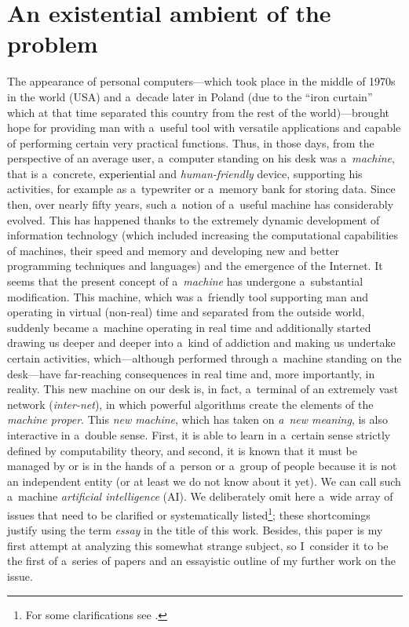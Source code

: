 \section{An existential ambient of the problem}
The appearance of personal computers—which took place in the middle of 1970s in the world (USA) and a~decade later in Poland (due to the ``iron curtain'' which at that time separated this country from the rest of the world)—brought hope for providing man with a~useful tool with versatile applications and capable of performing certain very practical functions. Thus, in those days, from the perspective of an average user, a~computer standing on his desk was a~\textit{machine}, that is a~concrete,\textcolor{black}{ experiential} and \textit{human-friendly} device, supporting his activities, for example as a~typewriter or a~memory bank for storing data. Since then, over nearly fifty years, such a~notion of a~useful machine has considerably evolved. This has happened thanks to the extremely dynamic development of information technology (which included increasing the computational capabilities of machines, their speed and memory and developing new and better programming techniques and languages) and the emergence of the Internet. It seems that the present concept of a~\textit{machine} has undergone a~substantial modification. This machine, which was a~friendly tool supporting man and operating in virtual (non-real) time and separated from the outside world, suddenly became a~machine operating in real time and additionally started drawing us deeper and deeper into a~kind of addiction and making us undertake certain activities, which—although performed through a~machine standing on the desk—have far-reaching consequences in real time and, more importantly, in reality. This new machine on our desk is, in fact, a~terminal of an extremely vast network (\textit{inter-net}), in which powerful algorithms create the elements of the \textit{machine proper}. This \textit{new machine}, which has taken on \textit{a~new meaning}, is also interactive in a~double sense. First, it is able to learn in a~certain sense strictly defined by computability theory, and second, it is known that it must be managed by or is in the hands of a~person or a~group of people because it is not an independent entity (or at least we do not know about it yet). We can call such a~machine \textit{artificial intelligence} (AI). We deliberately omit here a~wide array of issues that need to be clarified or systematically listed\footnote{For some clarifications see
\parencite[][]{krzanowski_meta-ontology_2022}.%
}; these shortcomings justify using the term \textit{essay} in the title of this work. Besides, this paper is my first attempt at analyzing this somewhat strange subject, so I~consider it to be the first of a~series of papers and an essayistic outline of my further work on the issue.

